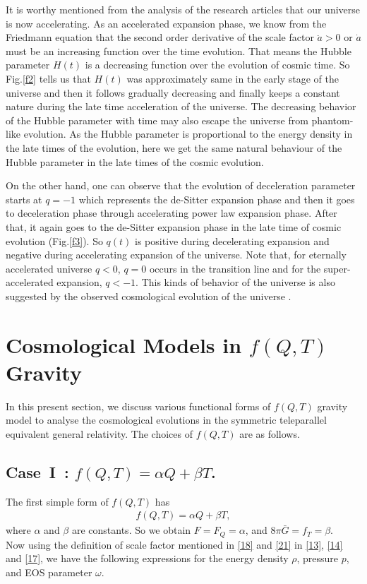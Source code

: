 \documentclass[showpacs,aps,amssymb,preprintnumbers,prd,amsmath,floatfix]{revtex4}
\def \a{\alpha}
\def \b{\beta}
\def \ben{\begin{eqnarray}}
\def \een{\end{eqnarray}}
\def \o{\omega}
\def \r{\rho}
\begin{document}
It is worthy mentioned from the analysis of the research articles \cite{Riess1,Perlmutter1,Perlmutter2,Spergel1,Komatsu} that our universe is now accelerating. As an accelerated expansion phase, we know from the Friedmann equation that the second order derivative of the scale factor $\ddot{a}>0$ or $\dot{a}$ must be an increasing function over the time evolution. That means the Hubble parameter $H(t)$ is a decreasing function over the evolution of cosmic time. So Fig.\ref{f2} tells us that $H(t)$ was approximately same in the early stage of the universe and then it follows gradually decreasing and finally keeps a constant nature during the late time acceleration of the universe. The decreasing behavior of the Hubble parameter with time may also escape the universe from phantom-like evolution. As the Hubble parameter is proportional to the energy density in the late times of the evolution, here we get the same natural behaviour of the Hubble parameter in the late times of the cosmic evolution.

On the other hand, one can observe that the evolution of deceleration parameter starts at $q=-1$ which represents the de-Sitter expansion phase and then it goes to deceleration phase through accelerating power law expansion phase. After that, it again goes to the de-Sitter expansion phase in the late time of cosmic evolution (Fig.\ref{f3}). So $q(t)$ is positive during decelerating expansion and negative during accelerating expansion of the universe. Note that, for eternally accelerated universe $q<0$, $q=0$ occurs in the transition line and for the super-accelerated expansion, $q<-1$. This kinds of behavior of the universe is also suggested by the observed cosmological evolution of the universe \cite{Dodelson}.

 




\section{Cosmological Models in $f(Q,T)$ Gravity}\label{V}
In this present section, we discuss various functional forms of $f(Q,T)$ gravity model to analyse the cosmological evolutions in the symmetric teleparallel equivalent general relativity. The choices of $f(Q,T)$ are as follows.



\subsection{Case~I~: $f(Q,T)=\a Q+\b T$.}
The first simple form of $f(Q,T)$ has 
\ben
f(Q,T)=\a Q+\b T,\label{21}
\een
where $\a$ and $\b$ are constants. So we obtain $F=F_Q=\a$, and $8\pi\bar{G}=f_T=\b$.
\\
Now using the definition of scale factor mentioned in \eqref{18} and \eqref{21} in \eqref{13}, \eqref{14} and \eqref{17}, we have the following expressions for the energy density $\r$, pressure $p$, and EOS parameter $\o$. 
  
\end{document}
